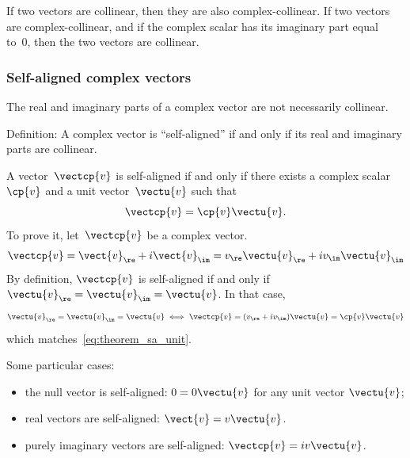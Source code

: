 If two vectors are collinear, then they are also complex-collinear.
If two vectors are complex-collinear, and if the complex scalar has its imaginary part equal to~0, then the two vectors are collinear.

\subsubsection{Self-aligned complex vectors}
The real and imaginary parts of a complex vector are not necessarily collinear.

Definition: A complex vector is ``self-aligned'' if and only if its real and imaginary parts are collinear.

    A vector~$\vectcp{v}$ is self-aligned if and only if there exists a complex scalar~$\cp{v}$ and a unit vector~$\vectu{v}$ such that
    \begin{equation}
        \vectcp{v} = \cp{v} \vectu{v}
        \text{.}
        \label{eq:theorem_sa_unit}
    \end{equation}
    To prove it, let~$\vectcp{v}$ be a complex vector.
    \begin{equation}
        \vectcp{v}
        =
        \vect{v}_\re + i \vect{v}_\im
        =
        v_\re \vectu{v}_\re + i v_\im \vectu{v}_\im
    \end{equation}
    By definition, $\vectcp{v}$ is self-aligned if and only if $\vectu{v}_\re = \vectu{v}_\im = \vectu{v}$.
    In that case,
    \begin{equation}
        \vectu{v}_\re = \vectu{v}_\im = \vectu{v}
        \iff
        \vectcp{v} = (v_\re + i v_\im) \vectu{v} = \cp{v} \vectu{v}
    \end{equation}
    which matches~\cref{eq:theorem_sa_unit}.

Some particular cases:
\begin{itemize}
    \item the null vector is self-aligned: $0 = 0 \vectu{v}$ for any unit vector $\vectu{v}$;
    \item real vectors are self-aligned: $\vect{v} = v \vectu{v}$.
    \item purely imaginary vectors are self-aligned: $\vectcp{v} = iv \vectu{v}$.
\end{itemize}






